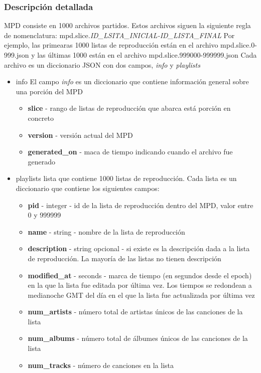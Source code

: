 \documentclass{article}
\begin{document}
	\subsubsection{Descripción detallada}
	MPD consiste en 1000 archivos partidos. Estos archivos siguen la siguiente regla de nomenclatura:
	mpd.slice.\textit{ID\_LSITA\_INICIAL-ID\_LISTA\_FINAL}
	Por ejemplo, las primearas 1000 listas de reproducción están en el archivo mpd.slice.0-999.json y las últimas 1000 están en el archivo mpd.slice.999000-999999.json
	Cada archivo es un diccionario JSON con dos campos, \textit{info} y \textit{playlists}
	\begin{itemize}
		\item info
		El campo \textit{info} es un diccionario que contiene información general sobre una porción del MPD
		\begin{itemize}
			\item \textbf{slice} - rango de listas de reproducción que abarca está porción en concreto
			\item \textbf{version} - versión actual del MPD
			\item \textbf{generated\_on} - maca de tiempo indicando cuando el archivo fue generado
		\end{itemize}
		\item playlists
		lista que contiene 1000 listas de reproducción. Cada lista es un diccionario que contiene los siguientes campos:
		\begin{itemize}
			\item \textbf{pid} - integer - id de la lista de reproducción dentro del MPD, valor entre 0 y 999999
			\item \textbf{name} - string - nombre de la lista de reproducción
			\item \textbf{description} - string opcional - si existe es la descripción dada a la lista de reproducción. La mayoría de las listas no tienen descripción
			\item \textbf{modified\_at} - seconds - marca de tiempo (en segundos desde el epoch) en la que la lista fue editada por última vez. Los tiempos se redondean a medianoche GMT del día en el que la lista fue actualizada por última vez
			\item \textbf{num\_artists} - número total de artistas únicos de las canciones de la lista
			\item \textbf{num\_albums} - número total de álbumes únicos de las canciones de la lista
			\item \textbf{num\_tracks} - número de canciones en la lista

\end{itemize}
\end{itemize}
\end{document}
